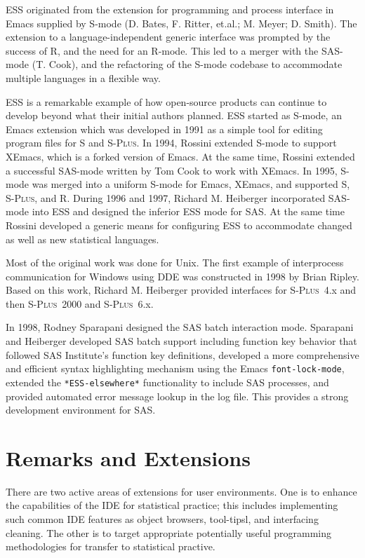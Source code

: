 \documentclass{article}
\newcommand*{\Splus}{\textsc{S-Plus}}
\newcommand{\stexttt}[1]{{\small\texttt{#1}}}
\begin{document}
ESS originated from the extension for programming and process
interface in Emacs supplied by S-mode (D. Bates, F. Ritter, et.al.; 
M. Meyer; D. Smith).  The extension to a language-independent generic
interface was prompted by the success of R, and the need for an
R-mode.  This led to a merger with the SAS-mode (T. Cook), and the
refactoring of the S-mode codebase to accommodate multiple languages
in a flexible way.

ESS is a remarkable example of how open-source products can continue
to develop beyond what their initial authors planned.  ESS started as
S-mode, an Emacs extension which was developed in 1991 as a simple
tool for editing program files for S and \Splus.  In 1994, Rossini
extended S-mode to support XEmacs, which is a forked version of Emacs.
At the same time, Rossini extended a successful SAS-mode written by
Tom Cook to work with XEmacs.  In 1995, S-mode was merged into a
uniform S-mode for Emacs, XEmacs, and supported S, \Splus, and R.
During 1996 and 1997, Richard M. Heiberger incorporated SAS-mode into
ESS and designed the inferior ESS mode for SAS.  At the same time
Rossini developed a generic means for configuring ESS to accommodate
changed as well as new statistical languages.

Most of the original work was done for Unix.  The first example of
interprocess communication for Windows using DDE was constructed in
1998 by Brian Ripley.  Based on this work, Richard M. Heiberger
provided interfaces for \Splus~4.x and then \Splus~2000 and
\Splus~6.x.

In 1998, Rodney Sparapani designed the SAS batch interaction
mode.  Sparapani and Heiberger developed SAS batch support including
function key behavior that followed SAS Institute's function key
definitions, developed a more comprehensive and efficient syntax
highlighting mechanism using the Emacs \stexttt{font-lock-mode},
extended the \stexttt{*ESS-elsewhere*} functionality to include SAS
processes, and provided automated error message lookup in the log
file.  This provides a strong development environment for SAS.

\section{Remarks and Extensions}
\label{sec:remarks}

There are two active areas of extensions for user environments.  One
is to enhance the capabilities of the IDE for statistical practice;
this includes implementing such common IDE features as object
browsers, tool-tipsl, and interfacing cleaning.  The other is to
target appropriate potentially useful programming methodologies for
transfer to statistical practive.
\end{document}
